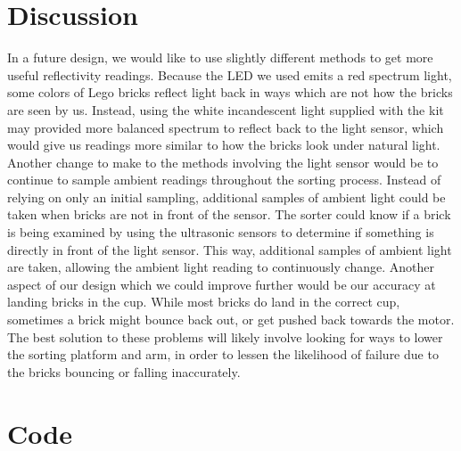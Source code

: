 \documentclass{article}
\begin{document}
\section{Discussion}
In a future design, we would like to use slightly different methods to get more useful reflectivity readings.
Because the LED we used emits a red spectrum light, some colors of Lego bricks reflect light back in ways which are not how the bricks are seen by us.
Instead, using the white incandescent light supplied with the kit may provided more balanced spectrum to reflect back to the light sensor, which would give us readings more similar to how the bricks look under natural light.
Another change to make to the methods involving the light sensor would be to continue to sample ambient readings throughout the sorting process.
Instead of relying on only an initial sampling, additional samples of ambient light could be taken when bricks are not in front of the sensor.
The sorter could know if a brick is being examined by using the ultrasonic sensors to determine if something is directly in front of the light sensor.
This way, additional samples of ambient light are taken, allowing the ambient light reading to continuously change.
Another aspect of our design which we could improve further would be our accuracy at landing bricks in the cup.
While most bricks do land in the correct cup, sometimes a brick might bounce back out, or get pushed back towards the motor.
The best solution to these problems will likely involve looking for ways to lower the sorting platform and arm, in order to lessen the likelihood of failure due to the bricks bouncing or falling inaccurately.

\newpage
\appendix
\section{Code}


\end{document}
